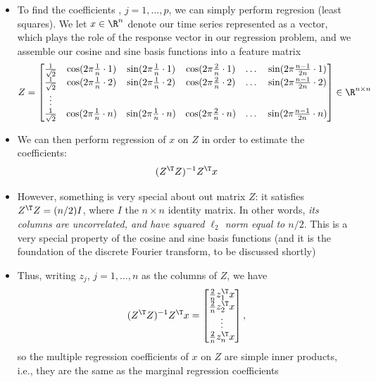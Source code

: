 \documentclass{article}
\begin{document}
\begin{itemize}
\item To find the coefficients , $j = 1,\dots,p$,
  we can simply perform regresion (least squares). We let $x \in \R^n$ denote
  our time series represented as a vector, which plays the role of the response
  vector in our regression problem, and we assemble our cosine and sine basis
  functions into a feature matrix  
  \[
  Z = \begin{bmatrix}
  \frac{1}{\sqrt{2}} & \cos(2\pi \frac{1}{n} \cdot 1) & \sin(2\pi \frac{1}{n}
  \cdot 1) & \cos(2\pi \frac{2}{n} \cdot 1) & \dots & \sin(2\pi \frac{n-1}{2n}
  \cdot 1) \\  
  \frac{1}{\sqrt{2}}  & \cos(2\pi \frac{1}{n} \cdot 2) & \sin(2\pi \frac{1}{n}
  \cdot 2) & \cos(2\pi \frac{2}{n} \cdot 2) & \dots & \sin(2\pi \frac{n-1}{2n}
  \cdot 2) \\  
  \vdots & & & & & \\
  \frac{1}{\sqrt{2}}  & \cos(2\pi \frac{1}{n} \cdot n) & \sin(2\pi \frac{1}{n}
  \cdot n) & \cos(2\pi \frac{2}{n} \cdot n) & \dots & \sin(2\pi \frac{n-1}{2n}
  \cdot n)  
  \end{bmatrix} \in \R^{n \times n}
  \]

\item We can then perform regression of $x$ on $Z$ in order to estimate the
  coefficients: 
  \[
  (Z^\T Z)^{-1} Z^\T x
  \]

\item However, something is very special about out matrix $Z$: it satisfies 
  $Z^\T Z = (n/2) I$, where $I$ the $n \times n$ identity matrix. In other
  words, \emph{its columns are uncorrelated, and have squared $\ell_2$ norm
    equal to $n/2$}. This is a very special property of the cosine and sine
  basis functions (and it is the foundation of the discrete Fourier transform, 
  to be discussed shortly)
    
\item Thus, writing $z_j$, $j = 1,\dots,n$ as the columns of $Z$, we have
  \renewcommand{\arraystretch}{1.3} 
  \[
  (Z^\T Z)^{-1} Z^\T x = \begin{bmatrix} \frac{2}{n} z_1^\T x \\ \frac{2}{n}
    z_2^\T x \\ \vdots \\ \frac{2}{n} z_n^\T  x \end{bmatrix},
  \]
  \renewcommand{\arraystretch}{1}%
  so the multiple regression coefficients of $x$ on $Z$ are simple inner
  products, i.e., they are the same as the marginal regression coefficients   


\end{itemize}
\end{document}
